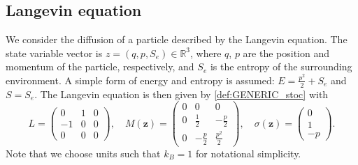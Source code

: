 \documentclass[openacc]{rsproca_new}%
\newcommand{\z}{\bm{z}}
\begin{document}
\subsection{Langevin equation} 
We consider the diffusion of a particle described by the Langevin equation. The state variable vector is 
$z = (q,p,S_e) \in \mathbb{R}^3$, where $q$, $p$ are 
the position and momentum of the particle, respectively, and $S_e$ is the entropy of the surrounding environment. 
A simple form of energy and entropy is assumed:
$E = \frac{p^2}{2} + S_e$ and $S = S_e$. 
The Langevin equation is then given by \eqref{def:GENERIC_stoc} with 
\begin{equation} \label{def:LM-lg}
    L =\begin{pmatrix} 0 & 1  & 0 \\ -1 & 0 & 0 \\ 0 & 0 & 0 \end{pmatrix}, \quad
    M(\z) = \begin{pmatrix}  0 & 0 & 0 \\  0 & \frac{1}{2} & -\frac{p}{2} \\ 0 & -\frac{p}{2} & \frac{p^2}{2}\end{pmatrix}, \quad \sigma(\z) = 
    \begin{pmatrix}
    0\\ 1\\ -p
    \end{pmatrix}.
\end{equation}
Note that we choose units such that $k_B = 1$ for notational simplicity. 
\end{document}
